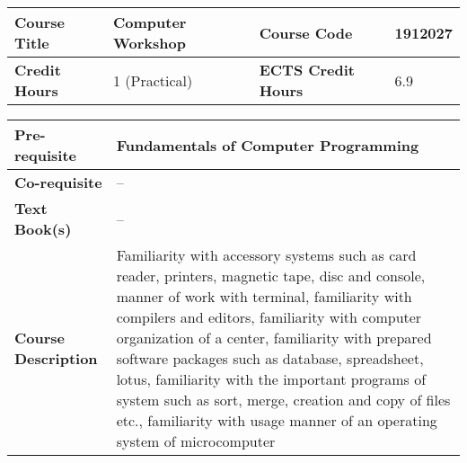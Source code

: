 \documentclass[12pt]{article}
\begin{document}
\begin{minipage}{\textwidth}
\begin{tabularx}{\textwidth}{|l|X|l|X|}
\hline
\textbf{Course Title}       & Computer Workshop  & \textbf{Course Code}       &  1912027 \\ \hline
\textbf{Credit Hours}       &   1 (Practical) & \textbf{ECTS Credit Hours}       &  6.9 \\ \hline
\end{tabularx}

\begin{tabularx}{\textwidth}{|l|X|}
\hline
\textbf{Pre-requisite}      &  Fundamentals of Computer Programming \\ \hline
\textbf{Co-requisite}       &  -- \\ \hline
\textbf{Text Book(s)}      & -- \\ \hline
\textbf{Course Description} & \begin{minipage}{.70\textwidth}
					\vspace{3mm}
					Familiarity with accessory systems such as card reader, printers, magnetic tape, disc and console,
					manner of work with terminal, familiarity with compilers and editors,
					familiarity with computer organization of a center, familiarity with prepared software packages such as		
					database, spreadsheet, lotus, familiarity with the important programs of system such as sort, merge,
					creation and copy of files etc., familiarity with usage manner of an operating system of microcomputer

					\vspace{3mm}
					\end{minipage} \\ \hline
\end{tabularx}
\end{minipage}


\bigskip
\bigskip
\end{document}
